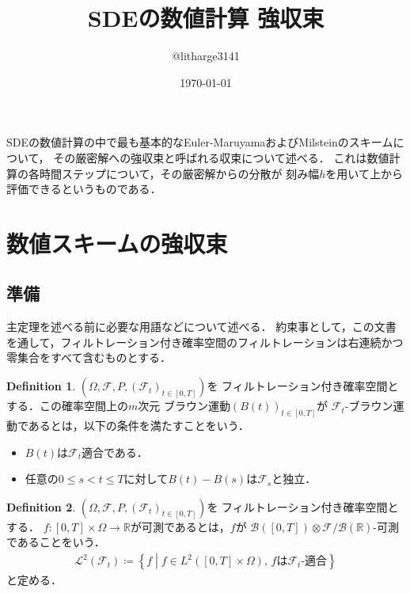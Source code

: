\documentclass[dvipdfmx,autodetect-engine]{jsarticle}
\theoremstyle{remark}
\theoremstyle{definition}
\newtheorem{definition}{Definition}[section]
\newcommand{\R}{\mathbb{R}}
\newcommand{\setmid}{\mathrel{} \middle| \mathrel{}}
\begin{document}
\title{SDEの数値計算 強収束}
\author{@litharge3141}
\date{\today}
\maketitle

\abstract{}
SDEの数値計算の中で最も基本的なEuler-MaruyamaおよびMilsteinのスキームについて，
その厳密解への強収束と呼ばれる収束について述べる．
これは数値計算の各時間ステップについて，その厳密解からの分散が
刻み幅$h$を用いて上から評価できるというものである．

\section{数値スキームの強収束}

\subsection{準備}
主定理を述べる前に必要な用語などについて述べる．
約束事として，この文書を通して，フィルトレーション付き確率空間のフィルトレーションは右連続かつ
零集合をすべて含むものとする．


\begin{definition}
    $(\Omega,\mathcal{F},P,(\mathcal{F}_{t})_{t \in [0,T]})$を
    フィルトレーション付き確率空間とする．この確率空間上の$m$次元
    ブラウン運動$(B(t))_{t \in [0,T]}$が
    $\mathcal{F}_t$-ブラウン運動であるとは，以下の条件を満たすことをいう．
    \begin{itemize}
        \item $B(t)$は$\mathcal{F}_{t}$適合である．
        \item 任意の$0\leq s < t\leq T$に対して$B(t)-B(s)$は$\mathcal{F}_{s}$と独立．
    \end{itemize}
\end{definition}


\begin{definition}
    $(\Omega,\mathcal{F},P,(\mathcal{F}_{t})_{t \in [0,T]})$を
    フィルトレーション付き確率空間とする．
    $f\colon [0,T]\times \Omega \to \R$が可測であるとは，$f$が
    $\mathcal{B}([0,T])\otimes \mathcal{F} / \mathcal{B(\R)}$-可測であることをいう．
    \begin{align}
        \mathcal{L}^{2}(\mathcal{F}_{t}) \coloneqq
        \left\{f \setmid f \in L^{2}([0,T]\times \Omega),\,
        f \text{は}\mathcal{F}_{t}\text{-適合} \right\}
    \end{align}
    と定める．
\end{definition}
\end{document}
